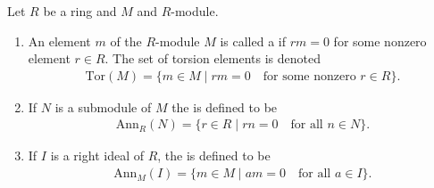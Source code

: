     \begin{definition}\label{def:torsions-and-annihilators}
        Let $R$ be a ring and $M$ and $R$-module. 
        \begin{enumerate}[label=(\arabic*)]
            \item An element $m$ of the $R$-module $M$ is called a  if $rm=0$ for some nonzero element $r \in R$. The set of torsion elements is denoted
                \begin{equation*}
                \begin{split}
                    \text{Tor}(M)=\{m \in M \mid rm=0\quad \text{for some nonzero $r \in R$}\}.
                \end{split}
                \end{equation*}
            \item If $N$ is a submodule of $M$ the  is defined to be
                \begin{equation*}
                \begin{split}
                    \text{Ann}_R(N) = \{r \in R \mid rn = 0 \quad \text{for all $n \in N$}\}.
                \end{split}
                \end{equation*}
            \item If $I$ is a right ideal of $R$, the  is defined to be
                \begin{equation*}
                \begin{split}
                    \text{Ann}_M(I) = \{m \in M \mid am = 0 \quad \text{for all $a \in I$}\}.
                \end{split}
                \end{equation*}
        \end{enumerate}
    \end{definition}

